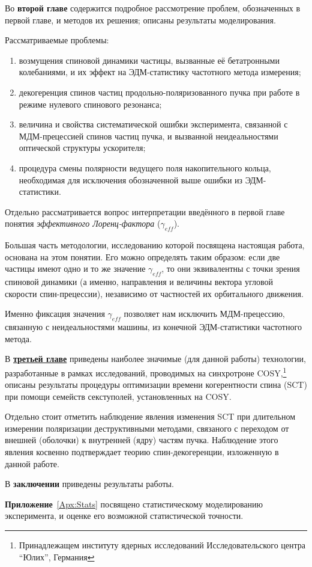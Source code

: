 Во \textbf{второй главе} содержится подробное рассмотрение проблем, обозначенных в первой главе, и методов их решения; описаны результаты моделирования. 

Рассматриваемые проблемы:
\begin{enumerate}
	\item возмущения спиновой динамики частицы, вызванные её бетатронными колебаниями, и их эффект на ЭДМ-статистику частотного метода измерения;
	\item декогеренция спинов частиц продольно-поляризованного пучка при работе в режиме нулевого спинового резонанса;
	\item величина и свойства систематической ошибки эксперимента, связанной с МДМ-прецессией спинов частиц пучка, и вызванной неидеальностями оптической структуры ускорителя;
	\item процедура смены полярности ведущего поля накопительного кольца, необходимая для исключения обозначенной выше ошибки из ЭДМ-статистики.
\end{enumerate}

Отдельно рассматривается вопрос интерпретации введённого в первой главе понятия \emph{эффективного Лоренц-фактора} ($\gamma_{eff}$). 

Большая часть методологии, исследованию которой посвящена настоящая работа, основана на этом понятии. Его можно определять таким образом: если две частицы имеют одно и то же значение $\gamma_{eff}$, то они эквивалентны с точки зрения спиновой динамики (а именно, направления и величины вектора угловой скорости спин-прецессии), независимо от частностей их орбитального движения. 

Именно фиксация значения $\gamma_{eff}$ позволяет нам исключить МДМ-прецессию, связанную с неидеальностями машины, из конечной ЭДМ-статистики частотного метода.

В \underline{\textbf{третьей главе}} приведены наиболее значимые (для данной работы) технологии, разработанные в рамках исследований, проводимых на синхротроне COSY,\footnote{Принадлежащем институту ядерных исследований Исследовательского центра ``Юлих'', Германия} описаны результаты процедуры оптимизации времени когерентности спина (SCT) при помощи семейств секступолей, установленных на COSY. 

Отдельно стоит отметить наблюдение явления изменения SCT при длительном измерении поляризации деструктивными методами, связаного с переходом от внешней (оболочки) к внутренней (ядру) частям пучка. Наблюдение этого явления косвенно подтверждает теорию спин-декогеренции, изложенную в данной работе.

В \textbf{заключении} приведены результаты работы.

\textbf{Приложение}~\ref{Apx:Stats} посвящено статистическому моделированию эксперимента, и оценке его возможной статистической точности.